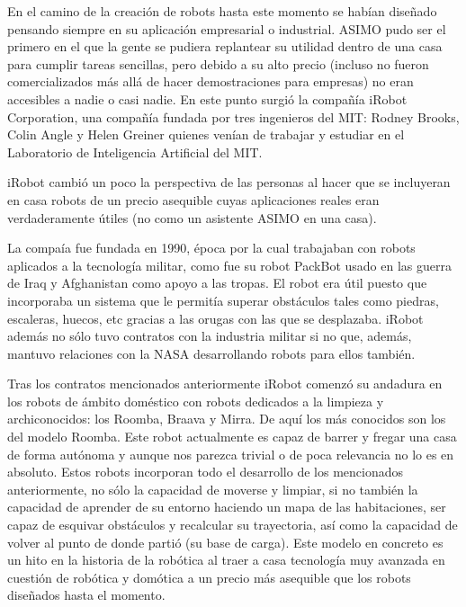 En el camino de la creación de robots hasta este momento se habían diseñado pensando siempre en su aplicación empresarial o industrial. ASIMO pudo ser el primero en el que la gente se pudiera replantear su utilidad dentro de una casa para cumplir tareas sencillas, pero debido a su alto precio (incluso no fueron comercializados más allá de hacer demostraciones para empresas) no eran accesibles a nadie o casi nadie. En este punto surgió la compañía iRobot Corporation, una compañía fundada por tres ingenieros del MIT: Rodney Brooks, Colin Angle y Helen Greiner quienes venían de trabajar y estudiar en el Laboratorio de Inteligencia Artificial del MIT.

iRobot cambió un poco la perspectiva de las personas al hacer que se incluyeran en casa robots de un precio asequible cuyas aplicaciones reales eran verdaderamente útiles (no como un asistente ASIMO en una casa).

La compaía fue fundada en 1990, época por la cual trabajaban con robots aplicados a la tecnología militar, como fue su robot PackBot usado en las guerra de Iraq y Afghanistan como apoyo a las tropas. El robot era útil puesto que incorporaba un sistema que le permitía superar obstáculos tales como piedras, escaleras, huecos, etc gracias a las orugas con las que se desplazaba. iRobot además no sólo tuvo contratos con la industria militar si no que, además, mantuvo relaciones con la NASA desarrollando robots para ellos también.

Tras los contratos mencionados anteriormente iRobot comenzó su andadura en los robots de ámbito doméstico con robots dedicados a la limpieza y archiconocidos: los Roomba, Braava y Mirra. De aquí los más conocidos son los del modelo Roomba. Este robot actualmente es capaz de barrer y fregar una casa de forma autónoma y aunque nos parezca trivial o de poca relevancia no lo es en absoluto. Estos robots incorporan todo el desarrollo de los mencionados anteriormente, no sólo la capacidad de moverse y limpiar, si no también la capacidad de aprender de su entorno haciendo un mapa de las habitaciones, ser capaz de esquivar obstáculos y recalcular su trayectoria, así como la capacidad de volver al punto de donde partió (su base de carga). Este modelo en concreto es un hito en la historia de la robótica al traer a casa tecnología muy avanzada en cuestión de robótica y domótica a un precio más asequible que los robots diseñados hasta el momento.
